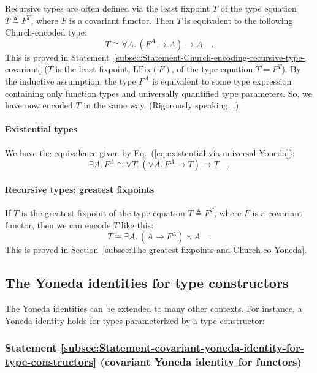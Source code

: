 Recursive types are often defined via the least fixpoint $T$ of the
type equation $T\triangleq F^{T}$, where $F$ is a covariant functor.
Then $T$ is equivalent to the following Church-encoded type:
\[
T\cong\forall A.\,(F^{A}\rightarrow A)\rightarrow A\quad.
\]
This is proved in Statement~\ref{subsec:Statement-Church-encoding-recursive-type-covariant}
($T$ is the least fixpoint, $\text{LFix}(F)$,
of the type equation $T=F^{T}$). By the inductive assumption, the
type $F^{A}$ is equivalent to some type expression containing only
function types and universally quantified type parameters. So, we
have now encoded $T$ in the same way. (Rigorously speaking, .) 

\paragraph{Existential types}

We have the equivalence given by Eq.~(\ref{eq:existential-via-universal-Yoneda}):
\[
\exists A.\,F^{A}\cong\forall T.\,(\forall A.\,F^{A}\rightarrow T)\rightarrow T\quad.
\]


\paragraph{Recursive types: greatest fixpoints}

If $T$ is the greatest fixpoint of the type equation $T\triangleq F^{T}$,
where $F$ is a covariant functor, then we can encode $T$ like this:
\[
T\cong\exists A.\,(A\rightarrow F^{A})\times A\quad.
\]
This is proved in Section~\ref{subsec:The-greatest-fixpoints-and-Church-co-Yoneda}.


\subsection{The Yoneda identities for type constructors\label{subsec:The-Yoneda-identities-for-type-constructors}}

The Yoneda identities can be extended to many other contexts. For
instance, a Yoneda identity holds for types parameterized by a type
constructor:

\subsubsection{Statement \label{subsec:Statement-covariant-yoneda-identity-for-type-constructors}\ref{subsec:Statement-covariant-yoneda-identity-for-type-constructors}
(covariant Yoneda identity for functors)}

